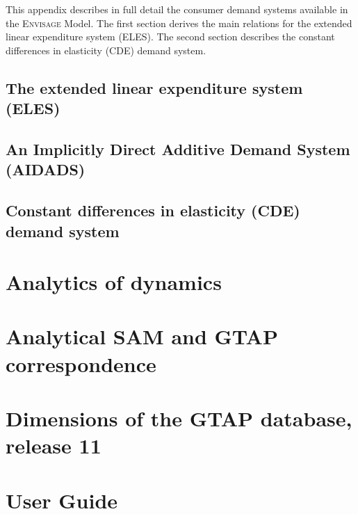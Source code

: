 \documentclass[11pt,letterpaper]{report}
\begin{document}
This appendix describes in full detail the consumer demand systems available in
the \textsc{Envisage} Model. The first section derives the main relations for
the extended linear expenditure system (ELES). The second section describes the
constant differences in elasticity (CDE) demand system.

\section{The extended linear expenditure system (ELES)}


\section{An Implicitly Direct Additive Demand System (AIDADS)}


\section{Constant differences in elasticity (CDE) demand system}


\chapter{Analytics of dynamics}
\label{chap:AppDyn}
\renewcommand{\theequation}{{C-}\arabic{equation}}
\setcounter{equation}{0}


\chapter{Analytical SAM and GTAP correspondence}


\chapter{Dimensions of the GTAP database, release 11}
\label{chap:GTAPDim}
\renewcommand{\theequation}{{D-}\arabic{equation}}
\setcounter{equation}{0}


\chapter{User Guide}



%
%


\end{document}
